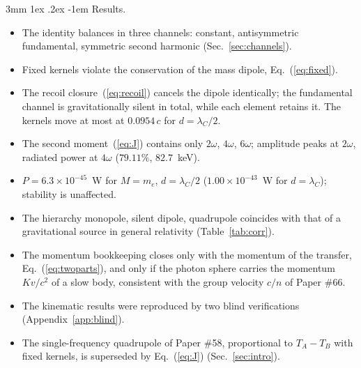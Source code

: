\documentclass[%
 reprint, amsmath,amssymb, aps, prb, ]{revtex4-2}
\makeatletter
\numberwithin{equation}{section}
\renewcommand\paragraph{%
  \@startsection{paragraph}{4}{\z@}%
    {3mm \@plus 1ex \@minus .2ex}%
    {-1em}%
    {\normalfont\normalsize\itshape}}
\makeatother
\begin{document}
\paragraph{Results.}
\begin{itemize}[leftmargin=2.4em]
\item[R1.] The identity balances in three channels: constant, antisymmetric fundamental, symmetric second harmonic (Sec.~\ref{sec:channels}).
\item[R2.] Fixed kernels violate the conservation of the mass dipole, Eq.~(\ref{eq:fixed}).
\item[R3.] The recoil closure~(\ref{eq:recoil}) cancels the dipole identically; the fundamental channel is gravitationally silent in total, while each element retains it. The kernels move at most at $0.0954\,c$ for $d = \lambda_C/2$.
\item[R4.] The second moment~(\ref{eq:J}) contains only $2\omega$, $4\omega$, $6\omega$; amplitude peaks at $2\omega$, radiated power at $4\omega$ ($79.11\%$, $82.7$~keV).
\item[R5.] $P = 6.3\times10^{-45}$~W for $M = m_e$, $d = \lambda_C/2$ ($1.00\times10^{-43}$~W for $d = \lambda_C$); stability is unaffected.
\item[R6.] The hierarchy monopole, silent dipole, quadrupole coincides with that of a gravitational source in general relativity (Table~\ref{tab:corr}).
\item[R7.] The momentum bookkeeping closes only with the momentum of the transfer, Eq.~(\ref{eq:twoparts}), and only if the photon sphere carries the momentum $Kv/c^2$ of a slow body, consistent with the group velocity $c/n$ of Paper \#66.
\item[R8.] The kinematic results were reproduced by two blind verifications (Appendix~\ref{app:blind}).
\item[R9.] The single-frequency quadrupole of Paper \#58, proportional to $T_A - T_B$ with fixed kernels, is superseded by Eq.~(\ref{eq:J}) (Sec.~\ref{sec:intro}).
\end{itemize}
\end{document}
